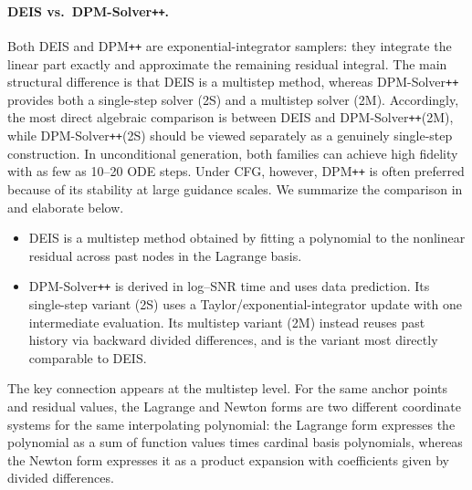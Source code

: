 \paragraph{DEIS vs.\ DPM-Solver\texttt{++}.}
Both DEIS and DPM\texttt{++} are exponential-integrator samplers: they
integrate the linear part exactly and approximate the remaining
residual integral. The main structural difference is that DEIS is a
multistep method, whereas DPM-Solver\texttt{++} provides both a
single-step solver (2S) and a multistep solver (2M). Accordingly, the
most direct algebraic comparison is between DEIS and
DPM-Solver\texttt{++}(2M), while DPM-Solver\texttt{++}(2S) should be
viewed separately as a genuinely single-step construction. In
unconditional generation, both families can achieve high fidelity with
as few as 10--20 ODE steps. Under CFG, however, DPM\texttt{++} is often
preferred because of its stability at large guidance scales. We
summarize the comparison in  and elaborate below.

\begin{itemize}[leftmargin=2em]
    \item {}
DEIS is a multistep method obtained by fitting a polynomial to the
nonlinear residual across past nodes in the Lagrange basis.

    \item {}
DPM-Solver\texttt{++} is derived in log--SNR time and uses data
prediction. Its single-step variant (2S) uses a Taylor/exponential-integrator
update with one intermediate evaluation. Its multistep variant (2M)
instead reuses past history via backward divided differences, and is the
variant most directly comparable to DEIS.
\end{itemize}

The key connection appears at the multistep level. For the same anchor
points and residual values, the Lagrange and Newton forms are two
different coordinate systems for the same interpolating polynomial: the
Lagrange form expresses the polynomial as a sum of function values times
cardinal basis polynomials, whereas the Newton form expresses it as a
product expansion with coefficients given by divided differences.


